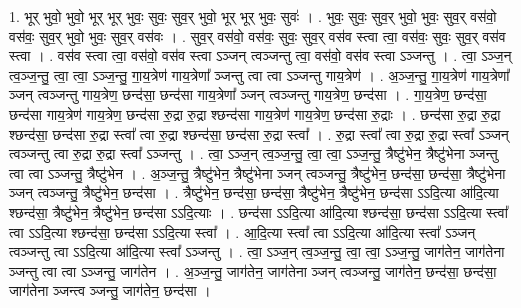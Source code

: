 \documentclass[17pt]{extarticle}
\begin{document}
1. भूर् भुवो॒ भुवो॒ भूर् भूर् भुवः॒ सुवः॒ सुव॒र् भुवो॒ भूर् भूर् भुवः॒ सुवः॑ । . भुवः॒ सुवः॒ सुव॒र् भुवो॒ भुवः॒ सुव॒र् वस॑वो॒ वस॑वः॒ सुव॒र् भुवो॒ भुवः॒ सुव॒र् वस॑वः । . सुव॒र् वस॑वो॒ वस॑वः॒ सुवः॒ सुव॒र् वस॑व स्त्वा त्वा॒ वस॑वः॒ सुवः॒ सुव॒र् वस॑व स्त्वा । . वस॑व स्त्वा त्वा॒ वस॑वो॒ वस॑व स्त्वा ऽञ्जन् त्वञ्जन्तु त्वा॒ वस॑वो॒ वस॑व स्त्वा ऽञ्जन्तु । . त्वा॒ ऽञ्ज॒न् त्व॒ञ्ज॒न्तु॒ त्वा॒ त्वा॒ ऽञ्ज॒न्तु॒ गा॒य॒त्रेण॑ गाय॒त्रेणा᳚ ञ्जन्तु त्वा त्वा ऽञ्जन्तु गाय॒त्रेण॑ । . अ॒ञ्ज॒न्तु॒ गा॒य॒त्रेण॑ गाय॒त्रेणा᳚ ञ्जन् त्वञ्जन्तु गाय॒त्रेण॒ छन्द॑सा॒ छन्द॑सा गाय॒त्रेणा᳚ ञ्जन् त्वञ्जन्तु गाय॒त्रेण॒ छन्द॑सा । . गा॒य॒त्रेण॒ छन्द॑सा॒ छन्द॑सा गाय॒त्रेण॑ गाय॒त्रेण॒ छन्द॑सा रु॒द्रा रु॒द्रा श्छन्द॑सा गाय॒त्रेण॑ गाय॒त्रेण॒ छन्द॑सा रु॒द्राः । . छन्द॑सा रु॒द्रा रु॒द्रा श्छन्द॑सा॒ छन्द॑सा रु॒द्रा स्त्वा᳚ त्वा रु॒द्रा श्छन्द॑सा॒ छन्द॑सा रु॒द्रा स्त्वा᳚ । . रु॒द्रा स्त्वा᳚ त्वा रु॒द्रा रु॒द्रा स्त्वा᳚ ऽञ्जन् त्वञ्जन्तु त्वा रु॒द्रा रु॒द्रा स्त्वा᳚ ऽञ्जन्तु । . त्वा॒ ऽञ्ज॒न् त्व॒ञ्ज॒न्तु॒ त्वा॒ त्वा॒ ऽञ्ज॒न्तु॒ त्रैष्टु॑भेन॒ त्रैष्टु॑भेना ञ्जन्तु त्वा त्वा ऽञ्जन्तु॒ त्रैष्टु॑भेन । . अ॒ञ्ज॒न्तु॒ त्रैष्टु॑भेन॒ त्रैष्टु॑भेना ञ्जन् त्वञ्जन्तु॒ त्रैष्टु॑भेन॒ छन्द॑सा॒ छन्द॑सा॒ त्रैष्टु॑भेना ञ्जन् त्वञ्जन्तु॒ त्रैष्टु॑भेन॒ छन्द॑सा । . त्रैष्टु॑भेन॒ छन्द॑सा॒ छन्द॑सा॒ त्रैष्टु॑भेन॒ त्रैष्टु॑भेन॒ छन्द॑सा ऽऽदि॒त्या आ॑दि॒त्या श्छन्द॑सा॒ त्रैष्टु॑भेन॒ त्रैष्टु॑भेन॒ छन्द॑सा ऽऽदि॒त्याः । . छन्द॑सा ऽऽदि॒त्या आ॑दि॒त्या श्छन्द॑सा॒ छन्द॑सा ऽऽदि॒त्या स्त्वा᳚ त्वा ऽऽदि॒त्या श्छन्द॑सा॒ छन्द॑सा ऽऽदि॒त्या स्त्वा᳚ । . आ॒दि॒त्या स्त्वा᳚ त्वा ऽऽदि॒त्या आ॑दि॒त्या स्त्वा᳚ ऽञ्जन् त्वञ्जन्तु त्वा ऽऽदि॒त्या आ॑दि॒त्या स्त्वा᳚ ऽञ्जन्तु । . त्वा॒ ऽञ्ज॒न् त्व॒ञ्ज॒न्तु॒ त्वा॒ त्वा॒ ऽञ्ज॒न्तु॒ जाग॑तेन॒ जाग॑तेना ञ्जन्तु त्वा त्वा ऽञ्जन्तु॒ जाग॑तेन । . अ॒ञ्ज॒न्तु॒ जाग॑तेन॒ जाग॑तेना ञ्जन् त्वञ्जन्तु॒ जाग॑तेन॒ छन्द॑सा॒ छन्द॑सा॒ जाग॑तेना ञ्जन्त्व ञ्जन्तु॒ जाग॑तेन॒ छन्द॑सा । \newline
\end{document}
